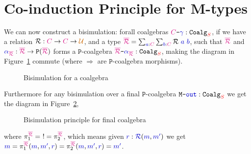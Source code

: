 \documentclass[twoside,11pt,openright]{report}
\newcommand*{\figref}[1]{Figure~\ref{#1}}
\newcommand*{\term}[1]{\textcolor{blue!80!black}{#1}}
\newcommand*{\type}[1]{\textcolor{magenta!90!black}{#1}}
\newcommand*{\container}[1]{\textcolor{red}{#1}}
\newcommand*{\universe}[1]{\textcolor{orange!80!black}{#1}}
\newcommand*{\coalg}[2]{#1\texttt{-}#2}
\newcommand*{\function}[1]{\textcolor{blue!60!black}{\ensuremath{\mathtt{#1}}}}
\newcommand*{\typeformer}[1]{\ensuremath{\mathtt{#1}}}
\newcommand*{\functor}[1]{\ensuremath{\mathbf{\mathtt{#1}}}}
\begin{document}
\section{Co-induction Principle for M-types}
We can now construct a bisimulation: forall coalgebras \(\coalg{\type{C}}{\term{\gamma}} : \typeformer{Coalg}_{\container{S}}\), if we have a relation \(\typeformer{\mathcal{R}} : \type{C} \rightarrow \type{C} \rightarrow \universe{\mathcal{U}}\), and a type \(\type{\overline{\mathcal{R}}} = \sum_{\term{a} : \type{C}} \sum_{\term{b} : \type{C}} \typeformer{\mathcal{R}}~\term{a}~\term{b}\), such that \(\type{\overline{\mathcal{R}}}\) and \(\term{\alpha}_{\type{\overline{\mathcal{R}}}} : \type{\overline{\mathcal{R}}} \rightarrow \functor{P}(\type{\overline{\mathcal{R}}})\) forms a \(\functor{P}\)-coalgebra \(\coalg{\type{\overline{\mathcal{R}}}}{\term{\alpha}_{\type{\overline{\mathcal{R}}}}} : \mathtt{Coalg}_{\container{S}}\), making the diagram in \figref{fig:coalgebra-coinduction-definition} commute (where \(\Longrightarrow\) are \(\functor{P}\)-coalgebra morphisms).
\begin{figure}[h]
  \centering
  \caption{Bisimulation for a coalgebra}
  \label{fig:coalgebra-coinduction-definition}
\end{figure}
\noindent Furthermore for any bisimulation over a final \(\functor{P}\)-coalgebra \(\coalg{\typeformer{M}}{\term{\mathtt{out}}}:\mathtt{Coalg}_{\container{S}}\) we get the diagram in \figref{fig:final-coalgebra-coinduction},
\begin{figure}[h]
  \centering
  \caption{Bisimulation principle for final coalgebra}
  \label{fig:final-coalgebra-coinduction}
\end{figure}
\noindent where \(\pi_1^{\type{\overline{\mathcal{R}}}} = ~! = \pi_2^{\type{\overline{\mathcal{R}}}}\), which means given \(\term{r} : \term{\mathcal{R}}(\term{m},\term{m'})\) we get \(\term{m} = \pi_1^{\type{\overline{\mathcal{R}}}} (\term{m}, \term{m'}, \term{r}) = \pi_2^{\type{\overline{\mathcal{R}}}} (\term{m}, \term{m'}, \term{r}) = \term{m'}\).
\end{document}
